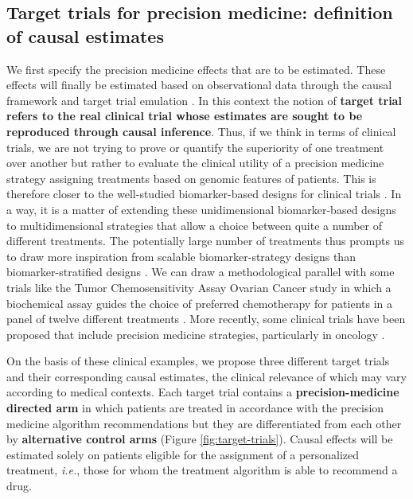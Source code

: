\documentclass[a4paper,12pt,twoside,onecolumn,openright,final,oldfontcommands]{memoir}
\begin{document}
\subsection{Target trials for precision medicine: definition of causal
estimates}\label{causal-estimates}

We first specify the precision medicine effects that are to be
estimated. These effects will finally be estimated based on
observational data through the causal framework and target trial
emulation \citep{hernan2016using}. In this context the notion of
\textbf{target trial refers to the real clinical trial whose estimates
are sought to be reproduced through causal inference}. Thus, if we think
in terms of clinical trials, we are not trying to prove or quantify the
superiority of one treatment over another but rather to evaluate the
clinical utility of a precision medicine strategy assigning treatments
based on genomic features of patients. This is therefore closer to the
well-studied biomarker-based designs for clinical trials
\citep{freidlin2010randomized}. In a way, it is a matter of extending
these unidimensional biomarker-based designs to multidimensional
strategies that allow a choice between quite a number of different
treatments. The potentially large number of treatments thus prompts us
to draw more inspiration from scalable biomarker-strategy designs than
biomarker-stratified designs \citep{freidlin2010randomized}. We can draw
a methodological parallel with some trials like the Tumor
Chemosensitivity Assay Ovarian Cancer study in which a biochemical assay
guides the choice of preferred chemotherapy for patients in a panel of
twelve different treatments \citep{cree2007prospective}. More recently,
some clinical trials have been proposed that include precision medicine
strategies, particularly in oncology
\citep{le2015molecularly, flaherty2020molecular}.

On the basis of these clinical examples, we propose three different
target trials and their corresponding causal estimates, the clinical
relevance of which may vary according to medical contexts. Each target
trial contains a \textbf{precision-medicine directed arm} in which
patients are treated in accordance with the precision medicine algorithm
recommendations but they are differentiated from each other by
\textbf{alternative control arms} (Figure \ref{fig:target-trials}).
Causal effects will be estimated solely on patients eligible for the
assignment of a personalized treatment, \emph{i.e.}, those for whom the
treatment algorithm is able to recommend a drug.
\end{document}
